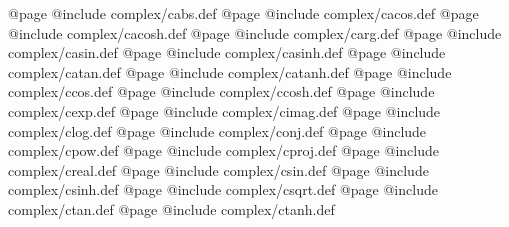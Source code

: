 @page @include   complex/cabs.def
@page @include   complex/cacos.def
@page @include   complex/cacosh.def
@page @include   complex/carg.def
@page @include   complex/casin.def
@page @include   complex/casinh.def
@page @include   complex/catan.def
@page @include   complex/catanh.def
@page @include   complex/ccos.def
@page @include   complex/ccosh.def
@page @include   complex/cexp.def
@page @include   complex/cimag.def
@page @include   complex/clog.def
@page @include   complex/conj.def
@page @include   complex/cpow.def
@page @include   complex/cproj.def
@page @include   complex/creal.def
@page @include   complex/csin.def
@page @include   complex/csinh.def
@page @include   complex/csqrt.def
@page @include   complex/ctan.def
@page @include   complex/ctanh.def
